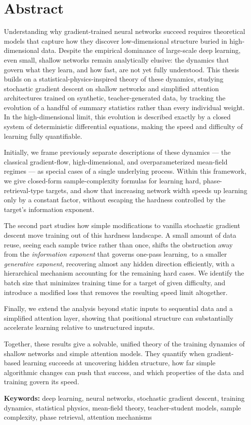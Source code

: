 \chapter*{Abstract}

\begin{noparskip}

Understanding why gradient-trained neural networks succeed requires theoretical models that capture how they discover low-dimensional structure buried in high-dimensional data. Despite the empirical dominance of large-scale deep learning, even small, shallow networks remain analytically elusive: the dynamics that govern what they learn, and how fast, are not yet fully understood.
This thesis builds on a statistical-physics-inspired theory of these dynamics, studying stochastic gradient descent on shallow networks and simplified attention architectures trained on synthetic, teacher-generated data, by tracking the evolution of a handful of summary statistics rather than every individual weight.
In the high-dimensional limit, this evolution is described exactly by a closed system of deterministic differential equations, making the speed and difficulty of learning fully quantifiable.

Initially, we frame previously separate descriptions of these dynamics --- the classical gradient-flow, high-dimensional, and overparameterized mean-field regimes --- as special cases of a single underlying process. Within this framework, we give closed-form sample-complexity formulas for learning hard, phase-retrieval-type targets, and show that increasing network width speeds up learning only by a constant factor, without escaping the hardness controlled by the target's information exponent.

The second part studies how simple modifications to vanilla stochastic gradient descent move training out of this hardness landscape. A small amount of data reuse, seeing each sample twice rather than once, shifts the obstruction away from the \emph{information exponent} that governs one-pass learning, to a smaller \emph{generative exponent}, recovering almost any hidden direction efficiently, with a hierarchical mechanism accounting for the remaining hard cases. We identify the batch size that minimizes training time for a target of given difficulty, and introduce a modified loss that removes the resulting speed limit altogether.

Finally, we extend the analysis beyond static inputs to sequential data and a simplified attention layer, showing that positional structure can substantially accelerate learning relative to unstructured inputs.

Together, these results give a solvable, unified theory of the training dynamics of shallow networks and simple attention models. They quantify when gradient-based learning succeeds at uncovering hidden structure, how far simple algorithmic changes can push that success, and which properties of the data and training govern its speed.
\end{noparskip}

\textbf{Keywords:} deep learning, neural networks, stochastic gradient descent, training dynamics, statistical physics, mean-field theory, teacher-student models, sample complexity, phase retrieval, attention mechanisms

